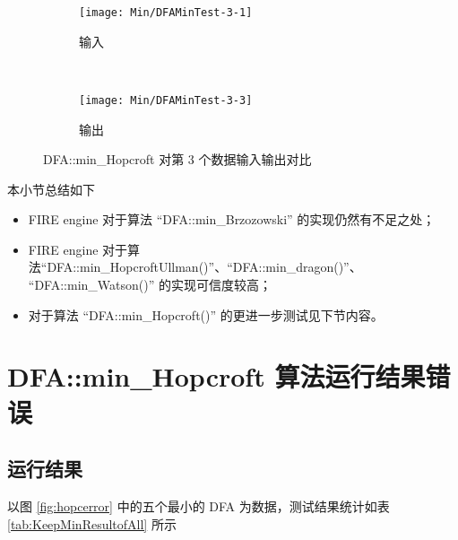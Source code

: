 \begin{figure}[!htbp]
    \centering
    \begin{subfigure}[b]{0.4\textwidth}
        \texttt{[image: Min/DFAMinTest-3-1]}
        \caption{输入}
        \label{fig:DFAMin-3-1-inside}
    \end{subfigure}
    ~
    \begin{subfigure}[b]{0.4\textwidth}
        \texttt{[image: Min/DFAMinTest-3-3]}
        \caption{输出}
        \label{fig:DFAMin-3-3-inside}
    \end{subfigure}
    \caption{DFA::min\_Hopcroft 对第 3 个数据输入输出对比}
    \label{fig:DFAMinHoop-3}
  \end{figure}


本小节总结如下
\begin{itemize}
    \item FIRE engine 对于算法 “DFA::min\_Brzozowski” 的实现仍然有不足之处；
    \item FIRE engine 对于算法“DFA::min\_HopcroftUllman()”、“DFA::min\_dragon()”、\\ “DFA::min\_Watson()” 的实现可信度较高；
    \item 对于算法 “DFA::min\_Hopcroft()” 的更进一步测试见下节内容。
\end{itemize}


\newpage
\section{DFA::min\_Hopcroft 算法运行结果错误}\label{sec:fixHopcroft}

\subsection{运行结果}

以图 \ref{fig:hopcerror} 中的五个最小的 DFA 为数据，测试结果统计如表 \ref{tab:KeepMinResultofAll} 所示

